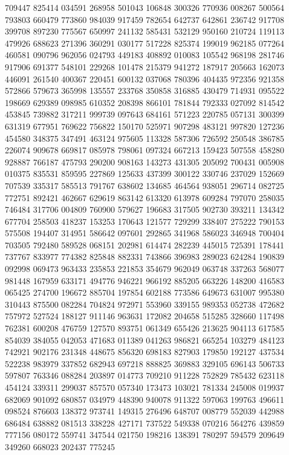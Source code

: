 {709447 825414 034591 268958 501043 106848 300326 770936 008267 500564 793803%
660479 773860 984039 917459 782654 642737 642861 236742 917708 399708 897230%
775567 650997 241132 585431 532129 950160 210724 119113 479926 688623 271396%
360291 030177 517228 825374 199019 962185 077264 460581 090796 962056 024793%
449183 408892 010083 105542 968198 281746 917906 691377 548101 229268 101478%
215379 941272 187917 205663 162073 446091 261540 400367 220451 600132 037068%
780396 404435 972356 921358 572866 579673 365998 135557 233768 350858 316885%
430479 714931 095522 198669 629389 098985 610352 208398 866101 781844 792333%
027092 814542 453845 739882 317211 999739 097643 684161 571223 220785 057131%
300399 631319 677951 769622 756822 150170 525971 907298 483121 997820 127236%
454580 348375 347491 463124 975605 113328 587306 726592 250548 386785 226074%
909678 669817 085978 798061 097324 667213 159423 507558 458280 928887 766187%
475793 290200 908163 143273 431305 205092 700431 005908 010375 835531 859595%
227869 125633 437399 300122 330746 237029 152669 707539 335317 585513 791767%
638602 134685 464564 938051 296714 082725 772751 892421 462667 629619 863142%
613320 613978 609284 797070 258035 746484 317706 004809 760900 579627 196683%
317505 902730 393211 134342 677704 258503 418237 153253 170643 121577 729299%
338407 275222 790153 575508 194407 314951 586642 097601 292865 341968 586023%
346948 700404 703505 792480 589528 068151 202981 614474 282239 445015 725391%
178441 737767 833977 774382 825848 882331 743866 396983 289023 624284 190839%
092998 069473 963433 235853 221853 354679 962049 063748 337263 568077 981448%
167959 633171 494776 946221 966192 885205 663226 148200 416583 065425 274700%
196672 885704 197854 602188 773586 649673 631007 995380 310443 875500 082284%
704824 972971 553960 339155 989353 052738 472682 757972 527524 188127 911146%
963631 172082 204658 515285 328660 117498 762381 600208 476759 127570 893751%
061349 655426 213625 904113 617585 854039 384055 042053 471683 011389 041263%
986821 665254 103279 484123 742921 902176 231348 448675 856320 698183 827903%
179850 192127 437534 522238 983979 337852 682943 697218 888825 369883 329105%
696143 506733 597807 763346 088284 203897 014773 709210 911228 752829 785432%
623118 454124 339311 299037 857570 057340 173473 103021 781334 245008 019937%
682069 901092 680857 034979 448390 940078 911322 597063 199763 496611 098524%
876603 138372 973741 149315 276496 648707 008779 552039 442988 686484 638882%
081513 338228 427171 737522 549338 070216 564276 439859 777156 080172 559741%
347544 021750 198216 138391 780297 594579 209649 349260 668023 202437 775245%
}
